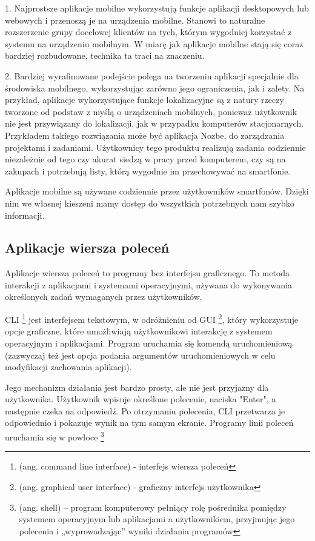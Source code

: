 1. Najprostsze aplikacje mobilne wykorzystują funkcje aplikacji desktopowych lub webowych i przenoszą je na urządzenia mobilne. Stanowi to naturalne rozszerzenie grupy docelowej klientów na tych, którym wygodniej korzystać z systemu na urządzeniu mobilnym. W miarę jak aplikacje mobilne stają się coraz bardziej rozbudowane, technika ta traci na znaczeniu. 

2. Bardziej wyrafinowane podejście polega na tworzeniu aplikacji specjalnie dla środowiska mobilnego, wykorzystując zarówno jego ograniczenia, jak i zalety. Na przykład, aplikacje wykorzystujące funkcje lokalizacyjne są z natury rzeczy tworzone od podstaw z myślą o urządzeniach mobilnych, ponieważ użytkownik nie jest przywiązany do lokalizacji, jak w przypadku komputerów stacjonarnych. Przykładem takiego rozwiązania może być aplikacja Nozbe, do zarządzania projektami i zadaniami. Użytkownicy tego produktu realizują zadania codziennie niezależnie od tego czy akurat siedzą w pracy przed komputerem, czy są na zakupach i potrzebują listy, którą wygodnie im przechowywać na smartfonie.

Aplikacje mobilne są używane codziennie przez użytkowników smartfonów. Dzięki nim we własnej kieszeni mamy dostęp do wszystkich potrzebnych nam szybko informacji.
\subsection{Aplikacje wiersza poleceń}
Aplikacje wiersza poleceń to programy bez interfejsu graficznego. To metoda interakcji z aplikacjami i systemami operacyjnymi, używana do wykonywania określonych zadań wymaganych przez użytkowników. 

CLI \footnote{(ang. command line interface) - interfejs wiersza poleceń} jest interfejsem tekstowym, w odróżnieniu od GUI \footnote{(ang. graphical user interface) - graficzny interfejs użytkownika}, który wykorzystuje opcje graficzne, które umożliwiają użytkownikowi interakcję z systemem operacyjnym i aplikacjami. Program uruchamia się komendą uruchomieniową (zazwyczaj też jest opcja podania argumentów uruchomieniowych w celu modyfikacji zachowania aplikacji).

Jego mechanizm działania jest bardzo prosty, ale nie jest przyjazny dla użytkownika. Użytkownik wpisuje określone polecenie, naciska "Enter", a następnie czeka na odpowiedź. Po otrzymaniu polecenia, CLI przetwarza je odpowiednio i pokazuje wynik na tym samym ekranie. Programy linii poleceń uruchamia się w powłoce \footnote{(ang. shell) – program komputerowy pełniący rolę pośrednika pomiędzy systemem operacyjnym lub aplikacjami a użytkownikiem, przyjmując jego polecenia i „wyprowadzając” wyniki działania programów}

